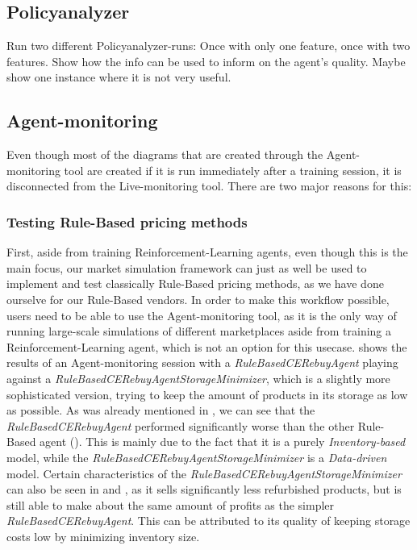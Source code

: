 \subsection*{Policyanalyzer}

Run two different Policyanalyzer-runs: Once with only one feature, once with two features. Show how the info can be used to inform on the agent's quality. Maybe show one instance where it is not very useful.

\subsection*{Agent-monitoring}

Even though most of the diagrams that are created through the Agent-monitoring tool are created if it is run immediately after a training session, it is disconnected from the Live-monitoring tool. There are two major reasons for this:

\subsubsection*{Testing Rule-Based pricing methods}

First, aside from training Reinforcement-Learning agents, even though this is the main focus, our market simulation framework can just as well be used to implement and test classically Rule-Based pricing methods, as we have done ourselve for our Rule-Based vendors. In order to make this workflow possible, users need to be able to use the Agent-monitoring tool, as it is the only way of running large-scale simulations of different marketplaces aside from training a Reinforcement-Learning agent, which is not an option for this usecase.  shows the results of an Agent-monitoring session with a \emph{RuleBasedCERebuyAgent} playing against a \emph{RuleBasedCERebuyAgentStorageMinimizer}, which is a slightly more sophisticated version, trying to keep the amount of products in its storage as low as possible. As was already mentioned in , we can see that the \emph{RuleBasedCERebuyAgent} performed significantly worse than the other Rule-Based agent (). This is mainly due to the fact that it is a purely \emph{Inventory-based} model, while the \emph{RuleBasedCERebuyAgentStorageMinimizer} is a \emph{Data-driven} model. Certain characteristics of the \emph{RuleBasedCERebuyAgentStorageMinimizer} can also be seen in  and , as it sells significantly less refurbished products, but is still able to make about the same amount of profits as the simpler \emph{RuleBasedCERebuyAgent}. This can be attributed to its quality of keeping storage costs low by minimizing inventory size.

